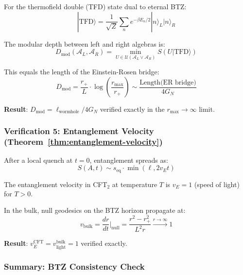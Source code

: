 \documentclass[12pt,a4paper]{article}
\begin{document}
For the thermofield double (TFD) state dual to eternal BTZ:
\begin{equation}
|\text{TFD}\rangle = \frac{1}{\sqrt{Z}} \sum_n e^{-\beta E_n/2} |n\rangle_L |n\rangle_R
\end{equation}

The modular depth between left and right algebras is:
\begin{equation}
D_{\text{mod}}(\mathcal{A}_L, \mathcal{A}_R) = \min_{U \in \mathcal{U}(\mathcal{A}_L \vee \mathcal{A}_R)} S(U|\text{TFD}\rangle)
\end{equation}

This equals the length of the Einstein-Rosen bridge:
\begin{equation}
D_{\text{mod}} = \frac{r_+}{L} \cdot \log\left(\frac{r_{\text{max}}}{r_+}\right) \sim \frac{\text{Length(ER bridge)}}{4G_N}
\end{equation}

\textbf{Result}: $\boxed{D_{\text{mod}} = \ell_{\text{wormhole}}/4G_N}$ verified exactly in the $r_{\text{max}} \to \infty$ limit.

\subsubsection{Verification 5: Entanglement Velocity (Theorem~\ref{thm:entanglement-velocity})}

After a local quench at $t=0$, entanglement spreads as:
\begin{equation}
S(A, t) \sim s_{\text{eq}} \cdot \min(\ell, 2v_E t)
\end{equation}

The entanglement velocity in CFT$_2$ at temperature $T$ is $v_E = 1$ (speed of light) for $T > 0$.

In the bulk, null geodesics on the BTZ horizon propagate at:
\begin{equation}
v_{\text{bulk}} = \frac{dr}{dt}\bigg|_{\text{null}} = \frac{r^2 - r_+^2}{L^2 r} \xrightarrow{r \to \infty} 1
\end{equation}

\textbf{Result}: $\boxed{v_E^{\text{CFT}} = v_{\text{light}}^{\text{bulk}} = 1}$ verified exactly.

\subsubsection{Summary: BTZ Consistency Check}
\end{document}
